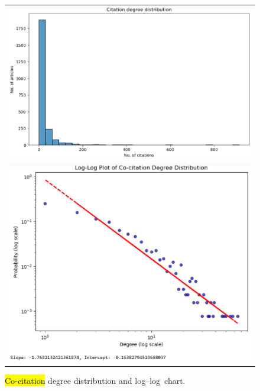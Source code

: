 \documentclass[jmse,review,accept,pdftex,moreauthors]{Definitions/mdpi}
\begin{document}
\begin{figure}[H]
\begin{tabular}{c}
	\includegraphics[height=0.33\textheight, keepaspectratio]{pics/citation_degree_distribution.eps}\\
	\includegraphics[height=0.4\textheight, keepaspectratio]{pics/loglog_citation_degree_distribution.eps}\\
		\end{tabular}
	\caption{\hl{Co-citation} %
 degree distribution and log--log~chart.} \label{fig:fig8}
\end{figure}
\end{document}
